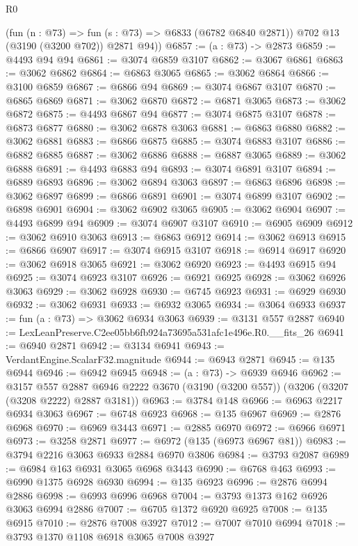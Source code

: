 \begin{lexlean}{R0}
\begin{coremodule}
        (fun (n : @73) => fun (s : @73) => @6833 (@6782 @6840 @2871))
        @702
        @13
        (@3190 (@3200 @702))
        @2871
        @94))
@6857 := (a : @73) -> @2873
@6859 := @4493 @94 @94
@6861 := @3074 @6859 @3107
@6862 := @3067 @6861
@6863 := @3062 @6862
@6864 := @6863 @3065
@6865 := @3062 @6864
@6866 := @3100 @6859
@6867 := @6866 @94
@6869 := @3074 @6867 @3107
@6870 := @6865 @6869
@6871 := @3062 @6870
@6872 := @6871 @3065
@6873 := @3062 @6872
@6875 := @4493 @6867 @94
@6877 := @3074 @6875 @3107
@6878 := @6873 @6877
@6880 := @3062 @6878 @3063
@6881 := @6863 @6880
@6882 := @3062 @6881
@6883 := @6866 @6875
@6885 := @3074 @6883 @3107
@6886 := @6882 @6885
@6887 := @3062 @6886
@6888 := @6887 @3065
@6889 := @3062 @6888
@6891 := @4493 @6883 @94
@6893 := @3074 @6891 @3107
@6894 := @6889 @6893
@6896 := @3062 @6894 @3063
@6897 := @6863 @6896
@6898 := @3062 @6897
@6899 := @6866 @6891
@6901 := @3074 @6899 @3107
@6902 := @6898 @6901
@6904 := @3062 @6902 @3065
@6905 := @3062 @6904
@6907 := @4493 @6899 @94
@6909 := @3074 @6907 @3107
@6910 := @6905 @6909
@6912 := @3062 @6910 @3063
@6913 := @6863 @6912
@6914 := @3062 @6913
@6915 := @6866 @6907
@6917 := @3074 @6915 @3107
@6918 := @6914 @6917
@6920 := @3062 @6918 @3065
@6921 := @3062 @6920
@6923 := @4493 @6915 @94
@6925 := @3074 @6923 @3107
@6926 := @6921 @6925
@6928 := @3062 @6926 @3063
@6929 := @3062 @6928
@6930 := @6745 @6923
@6931 := @6929 @6930
@6932 := @3062 @6931
@6933 := @6932 @3065
@6934 := @3064 @6933
@6937 := fun (a : @73) => @3062 @6934 @3063
@6939 := @3131 @557 @2887
@6940 := LexLeanPreserve.C2ee05bb6fb924a73695a531afc1e496e.R0.__fits_26
@6941 := @6940 @2871
@6942 := @3134 @6941
@6943 := VerdantEngine.ScalarF32.magnitude
@6944 := @6943 @2871
@6945 := @135 @6944
@6946 := @6942 @6945
@6948 := (a : @73) -> @6939 @6946
@6962 := @3157
    @557
    @2887
    @6946
    @2222
    @3670
    (@3190 (@3200 @557))
    (@3206 (@3207 (@3208 @2222) @2887 @3181))
@6963 := @3784 @148
@6966 := @6963 @2217 @6934 @3063
@6967 := @6748 @6923
@6968 := @135 @6967
@6969 := @2876 @6968
@6970 := @6969 @3443
@6971 := @2885 @6970
@6972 := @6966 @6971
@6973 := @3258 @2871
@6977 := @6972 (@135 (@6973 @6967 @81))
@6983 := @3794 @2216 @3063 @6933 @2884 @6970 @3806
@6984 := @3793 @2087
@6989 := @6984 @163 @6931 @3065 @6968 @3443
@6990 := @6768 @463
@6993 := @6990 @1375 @6928 @6930
@6994 := @135 @6923
@6996 := @2876 @6994 @2886
@6998 := @6993 @6996 @6968
@7004 := @3793 @1373 @162 @6926 @3063 @6994 @2886
@7007 := @6705 @1372 @6920 @6925
@7008 := @135 @6915
@7010 := @2876 @7008 @3927
@7012 := @7007 @7010 @6994
@7018 := @3793 @1370 @1108 @6918 @3065 @7008 @3927

\end{coremodule}
\end{lexlean}
